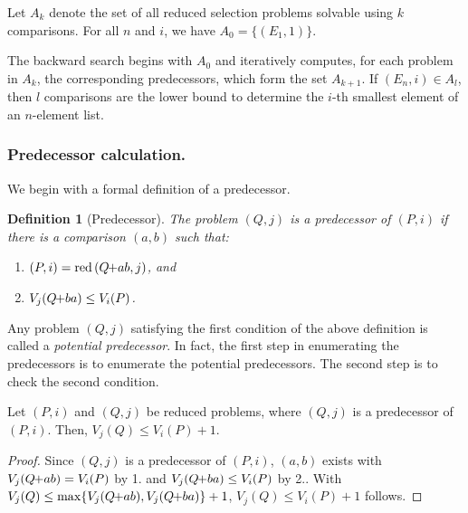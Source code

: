 \documentclass[twoside,leqno,twocolumn]{article}
\newcommand{\pchild}[3]{{#1}\kern-1pt{+}{#2}{#3}}
\newcommand{\reduced}[1]{\operatorname{red}{#1}}
\newtheorem{definition}{Definition}[section]
\begin{document}
Let $A_k$ denote the set of all reduced selection problems solvable using $k$ comparisons.
For all $n$ and $i$, we have $A_0 = \{(E_1, 1)\}$.

The backward search begins with $A_0$ and iteratively computes, for each problem in $A_k$, the corresponding predecessors, which form the set $A_{k + 1}$.
If $(E_n, i) \in A_l$, then $l$ comparisons are the lower bound to determine the $i$-th smallest element of an $n$-element list.

\subsubsection{Predecessor calculation.} \label{sec:backward:predecessor_calculation}
We begin with a formal definition of a predecessor.

\begin{definition}[Predecessor] \label{definition:predecessor_calculation}
  The problem $(Q, j)$ is a \emph{predecessor} of $(P, i)$ if there is a comparison $(a, b)$ such that:
  \begin{enumerate}
    \item $(P, i) = \reduced(\pchild{Q}{a}{b}, j)$, and
    \item $V_j(\pchild{Q}{b}{a}) \leq V_i(P)$.
  \end{enumerate}
\end{definition}

Any problem $(Q, j)$ satisfying the first condition of the above definition is called a \emph{potential predecessor}.
In fact, the first step in enumerating the predecessors is to enumerate the potential predecessors.
The second step is to check the second condition.

\begin{lemma} \label{lemma:predecessor_calculation}
  Let $(P, i)$ and $(Q, j)$ be reduced problems, where $(Q, j)$ is a predecessor of $(P, i)$.
  Then, $V_j(Q) \leq V_i(P) + 1$.
\end{lemma}

\begin{proof} \label{proof:predecessor_calculation}
  Since $(Q, j)$ is a predecessor of $(P, i)$, $(a, b)$ exists with $V_j(\pchild{Q}{a}{b}) =V_i(P)$ by 1. and $V_j(\pchild{Q}{b}{a}) \leq V_i(P)$ by 2..
  With $V_j(Q) \leq \max\{V_j(\pchild{Q}{a}{b}), V_j(\pchild{Q}{b}{a})\}+1$, $V_j(Q) \leq V_i(P) + 1$ follows.
\end{proof}
\end{document}

